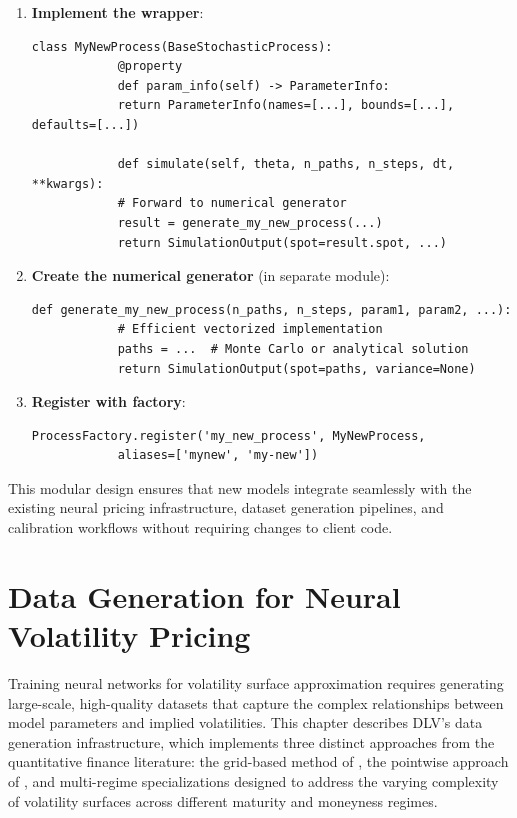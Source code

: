 	\begin{enumerate}[leftmargin=*]
		\item \textbf{Implement the wrapper}:
		\begin{lstlisting}[style=cleanpy]
			class MyNewProcess(BaseStochasticProcess):
			@property
			def param_info(self) -> ParameterInfo:
			return ParameterInfo(names=[...], bounds=[...], defaults=[...])
			
			def simulate(self, theta, n_paths, n_steps, dt, **kwargs):
			# Forward to numerical generator
			result = generate_my_new_process(...)
			return SimulationOutput(spot=result.spot, ...)
		\end{lstlisting}
		
		\item \textbf{Create the numerical generator} (in separate module):
		\begin{lstlisting}[style=cleanpy]
			def generate_my_new_process(n_paths, n_steps, param1, param2, ...):
			# Efficient vectorized implementation
			paths = ...  # Monte Carlo or analytical solution
			return SimulationOutput(spot=paths, variance=None)
		\end{lstlisting}
		
		\item \textbf{Register with factory}:
		\begin{lstlisting}[style=cleanpy]
			ProcessFactory.register('my_new_process', MyNewProcess,
			aliases=['mynew', 'my-new'])
		\end{lstlisting}
	\end{enumerate}
	
	This modular design ensures that new models integrate seamlessly with the existing neural pricing infrastructure, dataset generation pipelines, and calibration workflows without requiring changes to client code.

	
	\chapter{Data Generation for Neural Volatility Pricing}
	\label{ch:data}
	
	Training neural networks for volatility surface approximation requires generating large-scale, high-quality datasets that capture the complex relationships between model parameters and implied volatilities. This chapter describes DLV's data generation infrastructure, which implements three distinct approaches from the quantitative finance literature: the grid-based method of \citet{Horvath2021DLV}, the pointwise approach of \citet{Baschetti2024DeepCalibrationRandomGrids}, and multi-regime specializations designed to address the varying complexity of volatility surfaces across different maturity and moneyness regimes.
	
